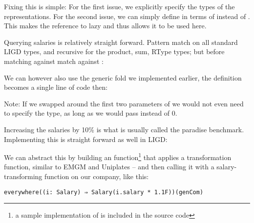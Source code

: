 Fixing this is simple: For the first issue, we explicitly specify the types of
the representations. For the second issue, we can simply define  in
terms of  instead of . This makes the reference to 
lazy and thus allows it to be used here.



\begin{example}

Querying salaries is relatively straight forward. Pattern match on all standard
LIGD types, and recursive for the product, sum, RType types; but before matching
against  match against :



We can however also use the generic fold we implemented earlier, the definition
becomes a single line of code then:



Note: If we swapped around the first two parameters of  we would not even
need to specify the  type, as long as we would pass  instead
of 0.

\end{example}

\begin{example}

Increasing the salaries by 10\% is what is usually called the paradise
benchmark. Implementing this is straight forward as well in LIGD:



We can abstract this by building an  function\footnote{a sample implementation of  is included in the source code} that applies
a transformation function, similar to EMGM and Uniplates  -- and
then calling it with a salary-transforming function on our company,
like this:
\begin{lstlisting}[caption=Increase the salaries using \cd{everywhere}]
  everywhere((i: Salary) ⇒ Salary(i.salary * 1.1F))(genCom)
\end{lstlisting}

\end{example}


